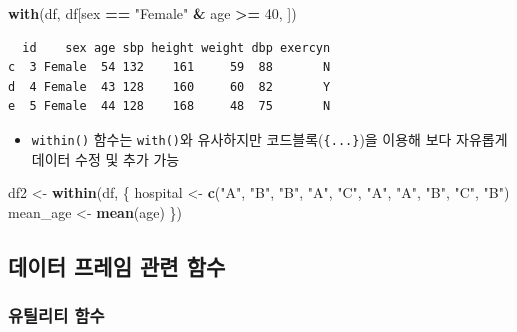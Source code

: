\documentclass[
  11pt,
]{krantz}
\newenvironment{Shaded}{\begin{snugshade}}{\end{snugshade}}
\newcommand{\DecValTok}[1]{\textcolor[rgb]{0.06,0.06,0.06}{#1}}
\newcommand{\KeywordTok}[1]{\textcolor[rgb]{0.27,0.27,0.27}{\textbf{#1}}}
\newcommand{\NormalTok}[1]{#1}
\newcommand{\OperatorTok}[1]{\textcolor[rgb]{0.43,0.43,0.43}{\textbf{#1}}}
\newcommand{\StringTok}[1]{\textcolor[rgb]{0.5,0.5,0.5}{#1}}
\providecommand{\tightlist}{%
  \setlength{\itemsep}{0pt}\setlength{\parskip}{0pt}}
\begin{document}
\normalsize

\footnotesize

\begin{Shaded}
\begin{Highlighting}[]
\KeywordTok{with}\NormalTok{(df, df[sex }\OperatorTok{==}\StringTok{ "Female"} \OperatorTok{&}\StringTok{ }\NormalTok{age }\OperatorTok{>=}\StringTok{ }\DecValTok{40}\NormalTok{, ])}
\end{Highlighting}
\end{Shaded}

\begin{verbatim}
  id    sex age sbp height weight dbp exercyn
c  3 Female  54 132    161     59  88       N
d  4 Female  43 128    160     60  82       Y
e  5 Female  44 128    168     48  75       N
\end{verbatim}

\normalsize

\begin{itemize}
\tightlist
\item
  \texttt{within()} 함수는 \texttt{with()}와 유사하지만 코드블록(\texttt{\{...\}})을 이용해 보다 자유롭게 데이터 수정 및 추가 가능
\end{itemize}

\footnotesize

\begin{Shaded}
\begin{Highlighting}[]
\NormalTok{df2 <-}\StringTok{ }\KeywordTok{within}\NormalTok{(df, \{}
\NormalTok{  hospital <-}\StringTok{ }\KeywordTok{c}\NormalTok{(}\StringTok{"A"}\NormalTok{, }\StringTok{"B"}\NormalTok{, }\StringTok{"B"}\NormalTok{, }\StringTok{"A"}\NormalTok{, }\StringTok{"C"}\NormalTok{, }
                \StringTok{"A"}\NormalTok{, }\StringTok{"A"}\NormalTok{, }\StringTok{"B"}\NormalTok{, }\StringTok{"C"}\NormalTok{, }\StringTok{"B"}\NormalTok{)}
\NormalTok{  mean_age <-}\StringTok{ }\KeywordTok{mean}\NormalTok{(age)}
\NormalTok{\})}
\end{Highlighting}
\end{Shaded}

\normalsize

\hypertarget{data-frame-function}{%
\subsection{데이터 프레임 관련 함수}\label{data-frame-function}}

\hypertarget{data-frame-utility}{%
\subsubsection*{유틸리티 함수}\label{data-frame-utility}}
\end{document}
